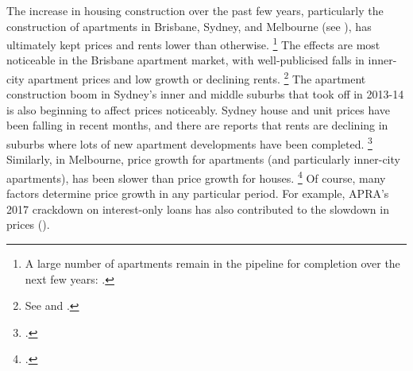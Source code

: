 The increase in housing construction over the past few years, particularly the construction of apartments in Brisbane, Sydney, and Melbourne (see ), has ultimately kept prices and rents lower than otherwise.%
	\footnote{A large number of apartments remain in the pipeline for completion over the next few years: \textcite[][Graph~3.14]{RBAStatementonMonetaryPolicy_Nov17}.}
The effects are most noticeable in the Brisbane apartment market, with well-publicised falls in inner-city apartment prices and low growth or declining rents.%
    \footnote{See  and \textcite{hamilton_smith_2018_brisbane_apartments}.}
The apartment construction boom in Sydney's inner and middle suburbs that took off in 2013-14 is also beginning to affect prices noticeably.
Sydney house and unit prices have been falling in recent months, and there are reports that rents are declining in suburbs where lots of new apartment developments have been completed.%
	\footcite{Devine_2018_new_sydney_rents}
Similarly, in Melbourne, price growth for apartments (and particularly inner-city apartments), has been slower than price growth for houses.%
	\footcite{ABS-2017-Residential}
Of course, many factors determine price growth in any particular period.
For example, APRA's 2017 crackdown on interest-only loans has also contributed to the slowdown in prices ().

